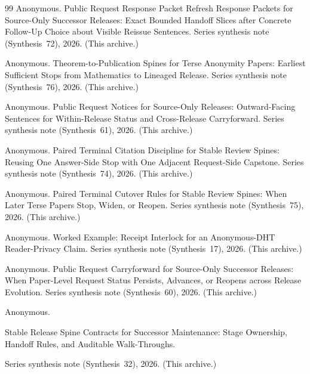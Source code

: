 \documentclass[11pt]{article}
\begin{document}
\begin{thebibliography}{99}
Anonymous.
\newblock Public Request Response Packet Refresh Response Packets for Source-Only Successor Releases: Exact Bounded Handoff Slices after Concrete Follow-Up Choice about Visible Reissue Sentences.
\newblock Series synthesis note (Synthesis~72), 2026. (This archive.)

Anonymous.
\newblock Theorem-to-Publication Spines for Terse Anonymity Papers: Earliest Sufficient Stops from Mathematics to Lineaged Release.
\newblock Series synthesis note (Synthesis~76), 2026. (This archive.)

Anonymous.
\newblock Public Request Notices for Source-Only Releases: Outward-Facing Sentences for Within-Release Status and Cross-Release Carryforward.
\newblock Series synthesis note (Synthesis~61), 2026. (This archive.)

Anonymous.
\newblock Paired Terminal Citation Discipline for Stable Review Spines: Reusing One Answer-Side Stop with One Adjacent Request-Side Capstone.
\newblock Series synthesis note (Synthesis~74), 2026. (This archive.)

Anonymous.
\newblock Paired Terminal Cutover Rules for Stable Review Spines: When Later Terse Papers Stop, Widen, or Reopen.
\newblock Series synthesis note (Synthesis~75), 2026. (This archive.)

Anonymous.
\newblock Worked Example: Receipt Interlock for an Anonymous-DHT Reader-Privacy Claim.
\newblock Series synthesis note (Synthesis~17), 2026. (This archive.)



Anonymous.
\newblock Public Request Carryforward for Source-Only Successor Releases: When Paper-Level Request Status Persists, Advances, or Reopens across Release Evolution.
\newblock Series synthesis note (Synthesis~60), 2026. (This archive.)

Anonymous.

\newblock Stable Release Spine Contracts for Successor Maintenance: Stage Ownership, Handoff Rules, and Auditable Walk-Throughs.

\newblock Series synthesis note (Synthesis~32), 2026. (This archive.)

\end{thebibliography}
\end{document}
